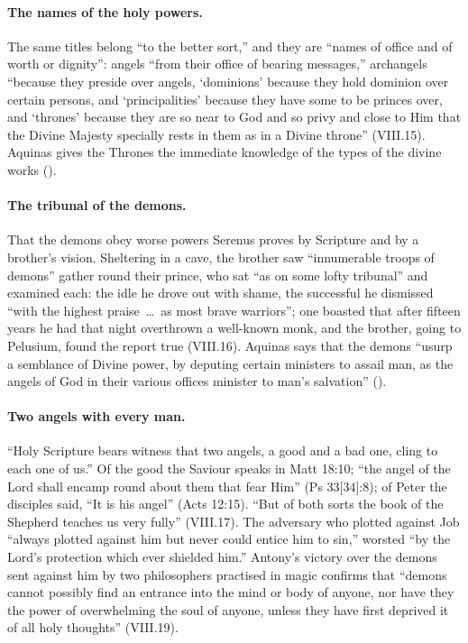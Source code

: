 \paragraph{The names of the holy powers.} The same titles belong ``to the
better sort,'' and they are ``names of office and of worth or dignity'':
angels ``from their office of bearing messages,'' archangels ``because
they preside over angels, `dominions' because they hold dominion over
certain persons, and `principalities' because they have some to be
princes over, and `thrones' because they are so near to God and so privy
and close to Him that the Divine Majesty specially rests in them as in a
Divine throne'' (VIII.15). Aquinas gives the Thrones the immediate
knowledge of the types of the divine works ().

\paragraph{The tribunal of the demons.} That the demons obey worse powers
Serenus proves by Scripture and by a brother's vision. Sheltering in a
cave, the brother saw ``innumerable troops of demons'' gather round their
prince, who sat ``as on some lofty tribunal'' and examined each: the idle
he drove out with shame, the successful he dismissed ``with the highest
praise~\dots\ as most brave warriors''; one boasted that after fifteen
years he had that night overthrown a well-known monk, and the brother,
going to Pelusium, found the report true (VIII.16). Aquinas says that the
demons ``usurp a semblance of Divine power, by deputing certain ministers
to assail man, as the angels of God in their various offices minister to
man's salvation'' ().

\paragraph{Two angels with every man.} ``Holy Scripture bears witness that
two angels, a good and a bad one, cling to each one of us.'' Of the good
the Saviour speaks in Matt 18:10; ``the angel of the Lord shall encamp
round about them that fear Him'' (Ps 33[34]:8); of Peter the disciples
said, ``It is his angel'' (Acts 12:15). ``But of both sorts the book of
the Shepherd teaches us very fully'' (VIII.17). The adversary who plotted
against Job ``always plotted against him but never could entice him to
sin,'' worsted ``by the Lord's protection which ever shielded him.''
Antony's victory over the demons sent against him by two philosophers
practised in magic confirms that
``demons cannot possibly find an entrance into the mind or body of
anyone, nor have they the power of overwhelming the soul of anyone,
unless they have first deprived it of all holy thoughts'' (VIII.19).

